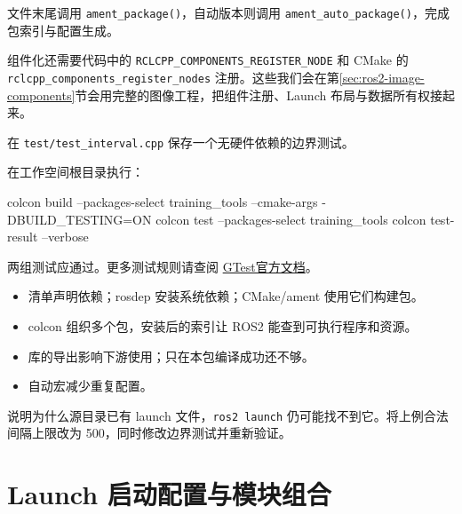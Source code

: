 文件末尾调用 \nolinkurl{ament_package()}，自动版本则调用 \nolinkurl{ament_auto_package()}，完成包索引与配置生成。

组件化还需要代码中的 \nolinkurl{RCLCPP_COMPONENTS_REGISTER_NODE} 和 CMake 的 \nolinkurl{rclcpp_components_register_nodes} 注册。这些我们会在第\ref{sec:ros2-image-components}节会用完整的图像工程，把组件注册、Launch 布局与数据所有权接起来。

\begin{example}[把参数边界变成自动检查]
在 \nolinkurl{test/test_interval.cpp} 保存一个无硬件依赖的边界测试。
\par\medskip\noindent\begin{minipage}{\linewidth}

\end{minipage}\par\smallskip
在工作空间根目录执行：
\par\medskip\noindent\begin{minipage}{\linewidth}
\begin{tbash}
colcon build --packages-select training_tools --cmake-args -DBUILD_TESTING=ON
colcon test --packages-select training_tools
colcon test-result --verbose
\end{tbash}
\end{minipage}\par\smallskip
两组测试应通过。更多测试规则请查阅 \href{https://google.github.io/googletest/}{GTest官方文档}。
\end{example}

\begin{conclusion}
\begin{itemize}
\item 清单声明依赖；rosdep 安装系统依赖；CMake/ament 使用它们构建包。
\item colcon 组织多个包，安装后的索引让 ROS2 能查到可执行程序和资源。
\item 库的导出影响下游使用；只在本包编译成功还不够。
\item 自动宏减少重复配置。
\end{itemize}
\end{conclusion}
\begin{exercise}
\label{ex:v2-ros-ament}
说明为什么源目录已有 launch 文件，\texttt{ros2 launch} 仍可能找不到它。将上例合法间隔上限改为 500，同时修改边界测试并重新验证。
\end{exercise}

\section{Launch 启动配置与模块组合}
